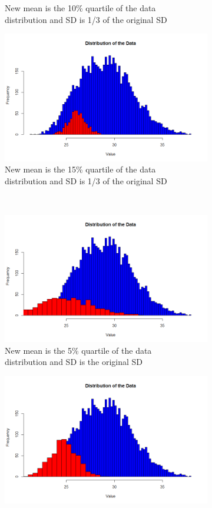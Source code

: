 \documentclass[10pt,a4paper]{article}
\begin{document}
\begin{enumerate}
\begin{figure}
\begin{subfigure}{.5\textwidth}
		\caption{New mean is the 10\% quartile of the data \\ distribution and SD is 1/3 of the original SD}
		\label{fig:sfig3}
	\end{subfigure}%
	\begin{subfigure}{.5\textwidth}
		\centering
		\includegraphics[width=.8\linewidth]{img/mean15sd13}
		\caption{New mean is the 15\% quartile of the data \\ distribution and SD is 1/3 of the original SD}
		\label{fig:sfig4}
	\end{subfigure}\\
	\begin{subfigure}{.5\textwidth}
		\centering
		\includegraphics[width=.8\linewidth]{img/mean5sd1}
		\caption{New mean is the 5\% quartile of the data \\ distribution and SD is the original SD}
		\label{fig:sfig5}
	\end{subfigure}%
	\begin{subfigure}{.5\textwidth}
		\centering
		\includegraphics[width=.8\linewidth]{img/mean5sd12}

\end{subfigure}
\end{figure}
\end{enumerate}
\end{document}
